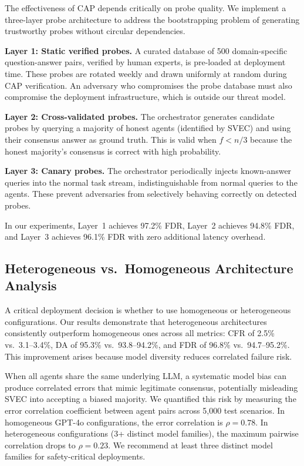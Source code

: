 \documentclass[journal,10pt]{IEEEtran}
\begin{document}
The effectiveness of CAP depends critically on probe quality. We implement a three-layer probe architecture to address the bootstrapping problem of generating trustworthy probes without circular dependencies.

\textbf{Layer 1: Static verified probes.} A curated database of 500 domain-specific question-answer pairs, verified by human experts, is pre-loaded at deployment time. These probes are rotated weekly and drawn uniformly at random during CAP verification. An adversary who compromises the probe database must also compromise the deployment infrastructure, which is outside our threat model.

\textbf{Layer 2: Cross-validated probes.} The orchestrator generates candidate probes by querying a majority of honest agents (identified by SVEC) and using their consensus answer as ground truth. This is valid when $f < n/3$ because the honest majority's consensus is correct with high probability.

\textbf{Layer 3: Canary probes.} The orchestrator periodically injects known-answer queries into the normal task stream, indistinguishable from normal queries to the agents. These prevent adversaries from selectively behaving correctly on detected probes.

In our experiments, Layer~1 achieves 97.2\% FDR, Layer~2 achieves 94.8\% FDR, and Layer~3 achieves 96.1\% FDR with zero additional latency overhead.

\subsection{Heterogeneous vs.\ Homogeneous Architecture Analysis}

A critical deployment decision is whether to use homogeneous or heterogeneous configurations. Our results demonstrate that heterogeneous architectures consistently outperform homogeneous ones across all metrics: CFR of 2.5\% vs.\ 3.1--3.4\%, DA of 95.3\% vs.\ 93.8--94.2\%, and FDR of 96.8\% vs.\ 94.7--95.2\%. This improvement arises because model diversity reduces correlated failure risk.

When all agents share the same underlying LLM, a systematic model bias can produce correlated errors that mimic legitimate consensus, potentially misleading SVEC into accepting a biased majority. We quantified this risk by measuring the error correlation coefficient between agent pairs across 5{,}000 test scenarios. In homogeneous GPT-4o configurations, the error correlation is $\rho = 0.78$. In heterogeneous configurations (3+ distinct model families), the maximum pairwise correlation drops to $\rho = 0.23$. We recommend at least three distinct model families for safety-critical deployments.
\end{document}
